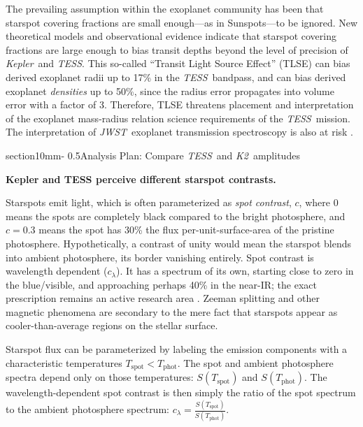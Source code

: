 \documentclass[letterpaper,12pt]{article}
\makeatletter
\renewcommand{\section}{\@startsection%
{section}{1}{0mm}{-\baselineskip}%
{0.5\baselineskip}{\normalfont\Large\bfseries}}%
\newcommand{\tess}{{\it TESS}}
\newcommand{\jwst}{{\it JWST}}
\newcommand{\kepler}{{\it Kepler}}
\newcommand{\ktwo}{{\it K2}}
\makeatother
\begin{document}
The prevailing assumption within the exoplanet community has been that starspot covering fractions are small enough---as in Sunspots---to be ignored.  New theoretical models \cite{2018ApJ...853..122R} and observational evidence \cite{2016MNRAS.463.2494F} indicate that starspot covering fractions are large enough to bias transit depths beyond the level of precision of \kepler\ and \tess.  This so-called ``Transit Light Source Effect'' (TLSE) can bias derived exoplanet radii up to 17\% in the \tess\ bandpass, and can bias derived exoplanet \emph{densities} up to 50\%, since the radius error propagates into volume error with a factor of 3.  Therefore, TLSE threatens placement and interpretation of the exoplanet mass-radius relation science requirements of the \tess\ mission.  The interpretation of \jwst\ exoplanet transmission spectroscopy is also at risk \cite{2019AJ....157...11W}.

\section{Analysis Plan: Compare \tess\ and \ktwo\ amplitudes}

\noindent\textbf{Kepler and TESS perceive different starspot contrasts.}

Starspots emit light, which is often parameterized as \emph{spot contrast}, $c$, where $0$ means the spots are completely black compared to the bright photosphere, and $c=0.3$ means the spot has 30\% the flux per-unit-surface-area of the pristine photosphere.  Hypothetically, a contrast of unity would mean the starspot blends into ambient photosphere, its border vanishing entirely.  Spot contrast is wavelength dependent ($c_\lambda$). It has a spectrum of its own, starting close to zero in the blue/visible, and approaching perhaps 40\% in the near-IR; the exact prescription remains an active research area \cite{2005LRSP....2....8B}.  Zeeman splitting and other magnetic phenomena are secondary to the mere fact that starspots appear as cooler-than-average regions on the stellar surface.  

Starspot flux can be parameterized by labeling the emission components with a characteristic temperatures $T_\text{spot}<T_\text{phot}$.  The spot and ambient photosphere spectra depend only on those temperatures: $S(T_\text{spot})$ and $S(T_\text{phot})$.  The wavelength-dependent spot contrast is then simply the ratio of the spot spectrum to the ambient photosphere spectrum:  $c_\lambda = \frac{S(T_\text{spot})}{ S(T_\text{phot})}$.
\end{document}
